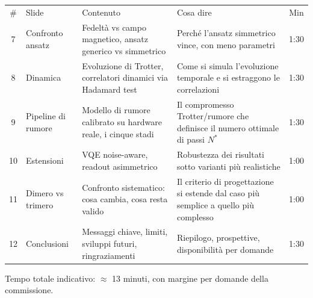 \documentclass[11pt,a4paper]{article}
\begin{document}
\begin{center}
\begin{tabular}{c L{2.6cm} L{4.7cm} L{5.5cm} c}
\toprule
{}
\\
\midrule
\# & Slide & Contenuto & Cosa dire & Min \\
\midrule
{}
7 & Confronto ansatz & Fedeltà vs campo magnetico, ansatz generico vs simmetrico & Perché l'ansatz simmetrico vince, con meno parametri & 1:30 \\
8 & Dinamica & Evoluzione di Trotter, correlatori dinamici via Hadamard test & Come si simula l'evoluzione temporale e si estraggono le correlazioni & 1:30 \\
9 & Pipeline di rumore & Modello di rumore calibrato su hardware reale, i cinque stadi & Il compromesso Trotter/rumore che definisce il numero ottimale di passi $N^*$ & 1:30 \\
10 & Estensioni & VQE noise-aware, readout asimmetrico & Robustezza dei risultati sotto varianti più realistiche & 1:00 \\
11 & Dimero vs trimero & Confronto sistematico: cosa cambia, cosa resta valido & Il criterio di progettazione si estende dal caso più semplice a quello più complesso & 1:00 \\
12 & Conclusioni & Messaggi chiave, limiti, sviluppi futuri, ringraziamenti & Riepilogo, prospettive, disponibilità per domande & 1:30 \\
\bottomrule
\end{tabular}
\end{center}

\vspace{10pt}
\noindent\footnotesize Tempo totale indicativo: $\approx$ 13 minuti, con margine per domande della commissione.
\end{document}
